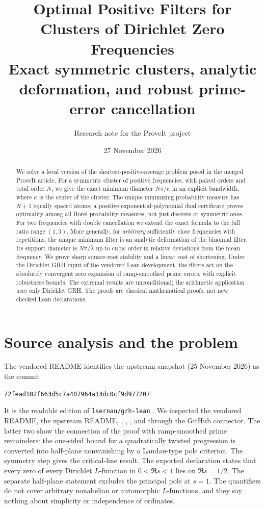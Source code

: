 \documentclass[11pt]{article}
\title{Optimal Positive Filters for Clusters of Dirichlet Zero Frequencies\\[4pt]\large Exact symmetric clusters, analytic deformation, and robust prime-error cancellation}
\author{Research note for the ProveIt project}
\date{27 November 2026}
\theoremstyle{remark}\newtheorem{remark}[theorem]{Remark}
\begin{document}
\maketitle
\begin{abstract}
We solve a local version of the shortest-positive-average problem posed in the merged ProveIt article. For a symmetric cluster of positive frequencies, with paired orders and total order $N$, we give the exact minimum diameter $N\pi/\kappa$ in an explicit bandwidth, where $\kappa$ is the center of the cluster. The unique minimizing probability measure has $N+1$ equally spaced atoms; a positive exponential-polynomial dual certificate proves optimality among all Borel probability measures, not just discrete or symmetric ones. For two frequencies with double cancellation we extend the exact formula to the full ratio range $(1,3)$. More generally, for \emph{arbitrary} sufficiently close frequencies with repetitions, the unique minimum filter is an analytic deformation of the binomial filter. Its support diameter is $N\pi/\bar\lambda$ up to cubic order in relative deviations from the mean frequency. We prove sharp square-root stability and a linear cost of shortening. Under the Dirichlet GRH input of the vendored Lean development, the filters act on the absolutely convergent zero expansion of ramp-smoothed prime errors, with explicit robustness bounds. The extremal results are unconditional; the arithmetic application uses only Dirichlet GRH. The proofs are classical mathematical proofs, not new checked Lean declarations.
\end{abstract}

\section{Source analysis and the problem}
The vendored README identifies the upstream snapshot (25 November 2026) as the commit
\begin{center}\texttt{72fead102f663d5c7a407964a13dc0cf9d977207}.\end{center}
It is the readable edition of \texttt{lsernau/grh-lean} \cite{vendor}. We inspected the vendored README, the upstream README, , , ,  and  through the GitHub connector. The latter two show the connection of the proof with ramp-smoothed prime remainders: the one-sided bound for a quadratically twisted progression is converted into half-plane nonvanishing by a Landau-type pole criterion. The symmetry step gives the critical-line result. The exported declaration  states that every zero of every Dirichlet $L$-function in $0<\Re s<1$ lies on $\Re s=1/2$. The separate half-plane statement excludes the principal pole at $s=1$. The quantifiers do not cover arbitrary nonabelian or automorphic $L$-functions, and they say nothing about simplicity or independence of ordinates.
\end{document}
